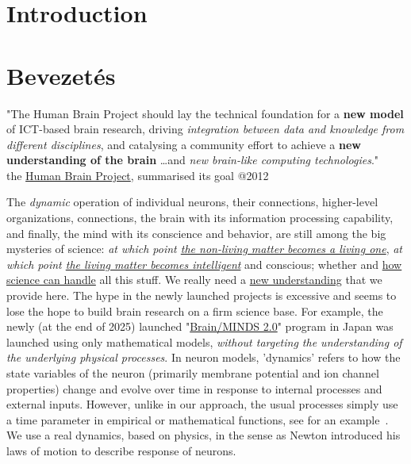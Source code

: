 
\ifx\magyar\undefined
\chapter{Introduction\label{ch:Introduction}}
\else
\chapter{Bevezetés\label{ch:Introduction}}
\fi
\iflatexml
\else
\minitoc
\fi


\quotationbox
{"The Human Brain Project should lay the technical foundation for a \textbf{new model} of ICT-based brain research, driving \textit{integration between data and knowledge from different disciplines}, and catalysing a community effort to achieve a \textbf{new understanding of the brain}%
\dots and \textit{new brain-like computing technologies}."\\
{the \href{https://www.humanbrainproject.eu/en/}{Human Brain Project},  summarised its goal @2012}}

\ifx\magyar\undefined
The \textit{dynamic} operation of individual neurons, their connections, higher-level organizations, connections,
the brain with its information processing capability, and finally, the mind with its conscience and behavior,
are still among the big mysteries of science: \textit{at which point
\hyperlink{LivingMatter}
{the non-living matter becomes a living one}}, \textit{at which point \hyperlink{CognitiveMatter}{the living matter becomes intelligent}} and conscious; whether and \hyperlink{PhysicalPictureNeuron}{how science can handle} all this stuff. 
We really need a \hyperlink{NewUnderstanding}
{new understanding} that we provide here.
%
The hype in the newly launched projects is excessive and seems to lose the hope 
to build brain research on a firm science base.
For example, the newly (at the end of 2025) launched "\href{https://brainminds.jp/en}{Brain/MINDS 2.0}" program in Japan was launched 
using only mathematical models, \textit{without targeting the understanding of the underlying physical processes}.
In neuron models, 'dynamics' refers to how the state variables of the neuron (primarily membrane potential and ion channel properties) change and evolve over time in response to internal processes and external inputs. However, unlike in our approach, the usual processes simply use a time parameter in empirical or mathematical functions, see for an example~\cite{NeuralDynamicsGertsner:2014}. We use a real dynamics,
based on physics, in the sense as Newton introduced his laws of motion to describe
response of neurons.


